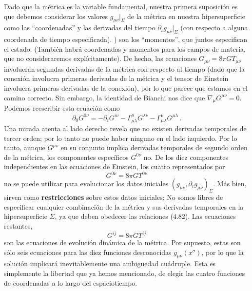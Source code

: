 \documentclass[11pt,b5paper,openany,twoside]{book}
\newcommand{\mn}{{\mu\nu}}
\newcommand{\p}[1]{{\partial_{#1}}}
\begin{document}
Dado que la métrica es la variable fundamental, nuestra primera suposición es que debemos considerar los valores $g_\mn |_\Sigma$ de la métrica en nuestra hipersuperficie como las ``coordenadas'' y las derivadas del tiempo $\p{t}g_\mn |_\Sigma$ (con respecto a alguna coordenada de tiempo especificada). ) son los ``momentos'', que juntos especifican el estado.
(También habrá coordenadas y momentos para los campos de materia, que no consideraremos explícitamente).
De hecho, las ecuaciones $G_\mn = 8\pi G T_\mn$ involucran segundas derivadas de la métrica con respecto al tiempo (dado que la conexión involucra primeras derivadas de la métrica y el tensor de Einstein involucra primeras derivadas de la conexión), por lo que parece que estamos en el camino correcto.
Sin embargo, la identidad de Bianchi nos dice que $\nabla_\mu G^\mn=0$.
Podemos reescribir esta ecuación como
\begin{equation}
\p0 G^{0\nu}=-\p{i}G^{i\nu}-\Gamma^\mu_{\mu\lambda}G^{\lambda\nu}
-\Gamma^\nu_{\mu\lambda}G^{\mu\lambda}\,.\label{4.81}
\end{equation}
Una mirada atenta al lado derecho revela que no existen derivadas temporales de tercer orden; por lo tanto no puede haber ninguno en el lado izquierdo.
Por lo tanto, aunque $G^\mn$ en su conjunto implica derivadas temporales de segundo orden de la métrica, los componentes específicos $G^{0\nu}$ no.
De los diez componentes independientes en las ecuaciones de Einstein, los cuatro representados por
\begin{equation}
G^{0\nu}=8\pi GT^{0\nu}\label{4.82}
\end{equation}
no se puede utilizar para evolucionar los datos iniciales $(g_\mn,\p{t}g_\mn)_\Sigma$.
Más bien, sirven como {\bf restricciones} sobre estos datos iniciales; No somos libres de especificar cualquier combinación de la métrica y sus derivadas temporales en la hipersuperficie $\Sigma$, ya que deben obedecer las relaciones (4.82).
Las ecuaciones restantes,
\begin{equation}
G^{ij}=8\pi GT^{ij}\label{4.83}
\end{equation}
son las ecuaciones de evolución dinámica de la métrica.
Por supuesto, estas son sólo seis ecuaciones para las diez funciones desconocidas $g_\mn(x^\sigma)$, por lo que la solución implicará inevitablemente una ambigüedad cuádruple.
Esta es simplemente la libertad que ya hemos mencionado, de elegir las cuatro funciones de coordenadas a lo largo del espaciotiempo.
\end{document}
